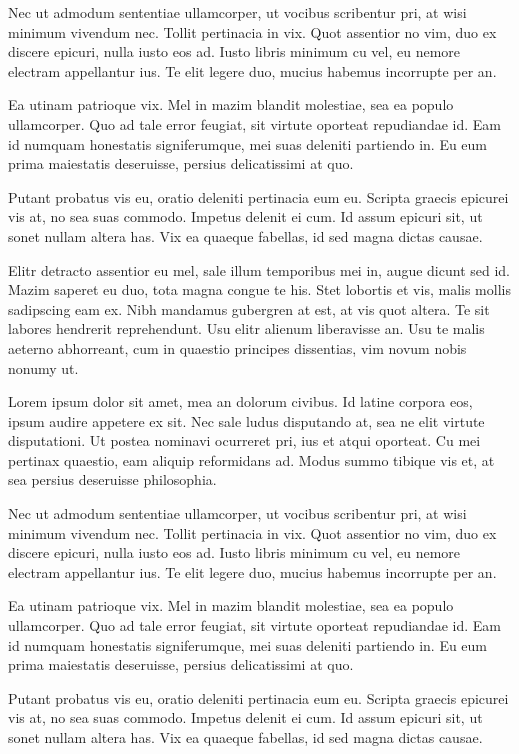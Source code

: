 \documentclass[twoside, 12pt]{article}
\begin{document}
    Nec ut admodum sententiae ullamcorper, ut vocibus scribentur pri, at wisi minimum vivendum nec. Tollit pertinacia in vix. 
    Quot assentior no vim, duo ex discere epicuri, nulla iusto eos ad. Iusto libris minimum cu vel, eu nemore electram appellantur ius. 
    Te elit legere duo, mucius habemus incorrupte per an.

    Ea utinam patrioque vix. Mel in mazim blandit molestiae, sea ea populo ullamcorper. Quo ad tale error feugiat, 
    sit virtute oporteat repudiandae id. Eam id numquam honestatis signiferumque, mei suas deleniti partiendo in. 
    Eu eum prima maiestatis deseruisse, persius delicatissimi at quo.

    Putant probatus vis eu, oratio deleniti pertinacia eum eu. Scripta graecis epicurei vis at, no sea suas commodo. 
    Impetus delenit ei cum. Id assum epicuri sit, ut sonet nullam altera has. Vix ea quaeque fabellas, id sed magna dictas causae.

    Elitr detracto assentior eu mel, sale illum temporibus mei in, augue dicunt sed id. Mazim saperet eu duo, 
    tota magna congue te his. Stet lobortis et vis, malis mollis sadipscing eam ex. Nibh mandamus gubergren at est, 
    at vis quot altera. Te sit labores hendrerit reprehendunt. Usu elitr alienum liberavisse an. Usu te malis aeterno 
    abhorreant, cum in quaestio principes dissentias, vim novum nobis nonumy ut.

    Lorem ipsum dolor sit amet, mea an dolorum civibus. Id latine corpora eos, ipsum audire appetere ex sit. 
    Nec sale ludus disputando at, sea ne elit virtute disputationi. Ut postea nominavi ocurreret pri, ius et atqui oporteat. 
    Cu mei pertinax quaestio, eam aliquip reformidans ad. Modus summo tibique vis et, at sea persius deseruisse philosophia.

    Nec ut admodum sententiae ullamcorper, ut vocibus scribentur pri, at wisi minimum vivendum nec. Tollit pertinacia in vix. 
    Quot assentior no vim, duo ex discere epicuri, nulla iusto eos ad. Iusto libris minimum cu vel, eu nemore electram appellantur ius. 
    Te elit legere duo, mucius habemus incorrupte per an.

    Ea utinam patrioque vix. Mel in mazim blandit molestiae, sea ea populo ullamcorper. Quo ad tale error feugiat, 
    sit virtute oporteat repudiandae id. Eam id numquam honestatis signiferumque, mei suas deleniti partiendo in. 
    Eu eum prima maiestatis deseruisse, persius delicatissimi at quo.

    Putant probatus vis eu, oratio deleniti pertinacia eum eu. Scripta graecis epicurei vis at, no sea suas commodo. 
    Impetus delenit ei cum. Id assum epicuri sit, ut sonet nullam altera has. Vix ea quaeque fabellas, id sed magna dictas causae.
\end{document}
